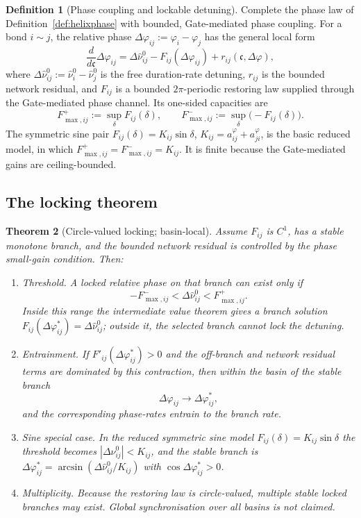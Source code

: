 \documentclass[11pt,a4paper]{article}
\newcommand{\cint}{\ensuremath{\mathfrak c}}
\theoremstyle{definition}
\newtheorem{definition}{Definition}[section]
\theoremstyle{plain}
\newtheorem{theorem}[definition]{Theorem}
\theoremstyle{remark}
\begin{document}
\begin{definition}[Phase coupling and lockable detuning]\label{def:phasecoupling}
Complete the phase law of Definition~\ref{def:helixphase} with bounded, Gate-mediated phase
coupling. For a bond \(i\sim j\), the relative phase
\(\Delta\varphi_{ij}:=\varphi_i-\varphi_j\) has the general local form
\[
\frac{d}{d\cint}\Delta\varphi_{ij}
=
\Delta\hat\nu_{ij}^{0}
-
F_{ij}(\Delta\varphi_{ij})
+
r_{ij}(\cint,\Delta\varphi),
\]
where \(\Delta\hat\nu_{ij}^{0}:=\hat\nu_i^0-\hat\nu_j^0\) is the free duration-rate
detuning, \(r_{ij}\) is the bounded network residual, and \(F_{ij}\) is a bounded
\(2\pi\)-periodic restoring law supplied through the Gate-mediated phase channel. Its
one-sided capacities are
\[
F^+_{\max,ij}:=\sup_\delta F_{ij}(\delta),
\qquad
F^-_{\max,ij}:=\sup_\delta\bigl(-F_{ij}(\delta)\bigr).
\]
The symmetric sine pair
\(F_{ij}(\delta)=K_{ij}\sin\delta\), \(K_{ij}=a_{ij}^{\varphi}+a_{ji}^{\varphi}\), is the
basic reduced model, in which \(F^+_{\max,ij}=F^-_{\max,ij}=K_{ij}\). It is finite because the
Gate-mediated gains are ceiling-bounded.
\end{definition}

\subsection{The locking theorem}

\begin{theorem}[Circle-valued locking; basin-local]\label{thm:phaselock}
Assume \(F_{ij}\) is \(C^1\), has a stable monotone branch, and the bounded network residual
is controlled by the phase small-gain condition. Then:
\begin{enumerate}[label=\textup{(\alph*)},leftmargin=1.2cm]
\item \emph{Threshold.} A locked relative phase on that branch can exist only if
\[
-F^-_{\max,ij}
<
\Delta\hat\nu_{ij}^{0}
<
F^+_{\max,ij}.
\]
Inside this range the intermediate value theorem gives a branch solution
\(F_{ij}(\Delta\varphi_{ij}^{*})=\Delta\hat\nu_{ij}^{0}\); outside it, the selected branch
cannot lock the detuning.
\item \emph{Entrainment.} If \(F'_{ij}(\Delta\varphi_{ij}^{*})>0\) and the off-branch and
network residual terms are dominated by this contraction, then within the basin of the stable
branch
\[
\Delta\varphi_{ij}\to\Delta\varphi_{ij}^{*},
\]
and the corresponding phase-rates entrain to the branch rate.
\item \emph{Sine special case.} In the reduced symmetric sine model
\(F_{ij}(\delta)=K_{ij}\sin\delta\) the threshold becomes
\(|\Delta\hat\nu_{ij}^{0}|<K_{ij}\), and the stable branch is
\(\Delta\varphi_{ij}^{*}=\arcsin(\Delta\hat\nu_{ij}^{0}/K_{ij})\) with
\(\cos\Delta\varphi_{ij}^{*}>0\).
\item \emph{Multiplicity.} Because the restoring law is circle-valued, multiple stable locked
branches may exist. Global synchronisation over all basins is not claimed.
\end{enumerate}
\end{theorem}
\end{document}
